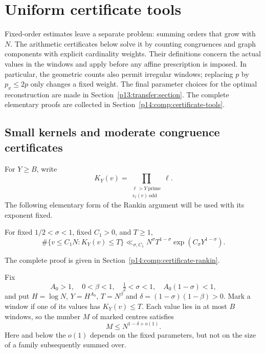 \section{Uniform certificate tools}
\label{p14:cert:section}

Fixed-order estimates leave a separate problem: summing orders that grow
with $N$. The arithmetic certificates below solve it by counting
congruences and graph components with explicit cardinality weights.
Their definitions concern the actual values in the windows and apply
before any affine prescription is imposed. In particular, the geometric
counts also permit irregular windows; replacing $p$ by $p_x\le2p$ only
changes a fixed weight. The final parameter choices for the optimal
reconstruction are made in Section~\ref{p13:transfer:section}.
The complete elementary proofs are collected in
Section~\ref{p14:comp:certificate-tools}.

\subsection{Small kernels and moderate congruence certificates}

For $Y\ge B$, write
\[
 K_Y(v)=\prod_{\substack{\ell>Y\ \mathrm{prime}\\v_\ell(v)\ \mathrm{odd}}}\ell.
\]
The following elementary form of the Rankin argument will be used with
its exponent fixed.

\begin{lemma}
\label{p1:core:rankin}
For fixed $1/2<\sigma<1$, fixed $C_1>0$, and $T\ge1$,
\begin{equation}
 \#\{v\le C_1N:K_Y(v)\le T\}
 \ll_{\sigma,C_1}N^\sigma T^{1-\sigma}
       \exp(C_\sigma Y^{1-\sigma}).
 \label{p1:core:rankin-bound}
\end{equation}
\end{lemma}
\noindent The complete proof is given in Section~\ref{p14:comp:certificate-rankin}.


Fix
\begin{equation}
 A_0>1,\quad 0<\beta<1,\quad \tfrac12<\sigma<1,
 \quad A_0(1-\sigma)<1,
 \label{p1:core:parameter-conditions}
\end{equation}
and put $H=\log N$, $Y=H^{A_0}$, $T=N^\beta$ and
$\delta=(1-\sigma)(1-\beta)>0$. Mark a window if one of its values
has $K_Y(v)\le T$. Each value lies in at most $B$ windows, so the
number $M$ of marked centres satisfies
\begin{equation}
 M\le N^{1-\delta+o(1)}.
 \label{p1:core:marks}
\end{equation}
Here and below the $o(1)$ depends on the fixed parameters, but not on
the size of a family subsequently summed over.

